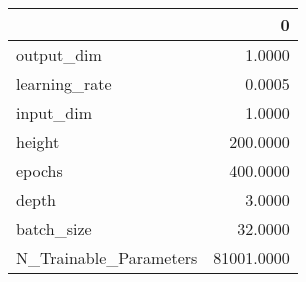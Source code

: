 \begin{tabular}{lr}
\toprule
{} &           0 \\
\midrule
output\_dim             &      1.0000 \\
learning\_rate          &      0.0005 \\
input\_dim              &      1.0000 \\
height                 &    200.0000 \\
epochs                 &    400.0000 \\
depth                  &      3.0000 \\
batch\_size             &     32.0000 \\
N\_Trainable\_Parameters &  81001.0000 \\
\bottomrule
\end{tabular}
